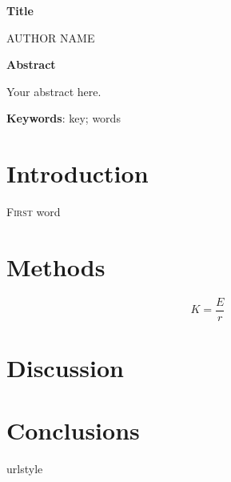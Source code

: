 \documentclass[12pt]{extarticle}
\begin{document}


{\selectfont 
\centerline{\huge{\textbf{Title}\Large}
}

\bigskip
\bigskip

\centerline{ \Large AUTHOR NAME\footnotemark}


\bigskip
\bigskip
\bigskip

\thispagestyle{fancy}

\bigskip
\bigskip
\bigskip

\noindent \textbf{Abstract}

Your abstract here.

\bigskip

\textbf{Keywords}: key; words

\bigskip
\bigskip
\newpage

\section{Introduction}

\lettrine[lines=3]{F}{irst} word \lipsum[1]

\lipsum[1]

\section{Methods}
\lipsum[1]

\begin{equation}
K = \frac{E}{r}
\end{equation}

\section{Discussion}
\lipsum[1]

\section{Conclusions}
\lipsum[1]


\newpage

\begin{thebibliography}{6}
	\providecommand{\natexlab}[1]{#1}
	\expandafter\ifx\csname urlstyle\endcsname\relax
	\providecommand{\doi}[1]{doi:\discretionary{}{}{}#1}\else
	\providecommand{\doi}{doi:\discretionary{}{}{}\begingroup
		\urlstyle{rm}\Url}\fi
	

\end{thebibliography}}
\end{document}

